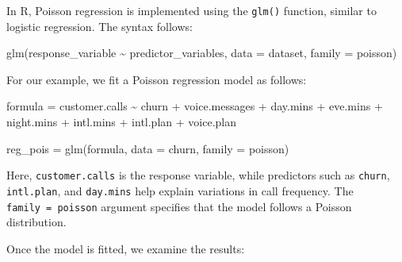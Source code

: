 \documentclass[
  11pt,
]{book}
\makeatletter
\newenvironment{Shaded}{}{}
\newcommand{\AttributeTok}[1]{#1}
\newcommand{\FunctionTok}[1]{#1}
\newcommand{\NormalTok}[1]{#1}
\newcommand{\OtherTok}[1]{\textcolor[rgb]{0.39,0.39,0.39}{#1}}
\newcommand{\SpecialCharTok}[1]{\textcolor[rgb]{0.39,0.39,0.39}{#1}}
\newenvironment{kframe}{%
\medskip{}
\setlength{\fboxsep}{.8em}
 \def\at@end@of@kframe{}%
 \ifinner\ifhmode%
  \def\at@end@of@kframe{\end{minipage}}%
  \begin{minipage}{\columnwidth}%
 \fi\fi%
 \def\FrameCommand##1{\hskip\@totalleftmargin \hskip-\fboxsep
 \colorbox{shadecolor}{##1}\hskip-\fboxsep
     \hskip-\linewidth \hskip-\@totalleftmargin \hskip\columnwidth}%
 \MakeFramed {\advance\hsize-\width
   \@totalleftmargin\z@ \linewidth\hsize
   \@setminipage}}%
 {\par\unskip\endMakeFramed%
 \at@end@of@kframe}
\renewenvironment{Shaded}{\begin{kframe}}{\end{kframe}}
\theoremstyle{definition}
\theoremstyle{definition}
\theoremstyle{definition}
\theoremstyle{definition}
\theoremstyle{remark}
\makeatother
\begin{document}
In R, Poisson regression is implemented using the \texttt{glm()} function, similar to logistic regression. The syntax follows:

\begin{Shaded}
\begin{Highlighting}[]
\FunctionTok{glm}\NormalTok{(response\_variable }\SpecialCharTok{\textasciitilde{}}\NormalTok{ predictor\_variables, }\AttributeTok{data =}\NormalTok{ dataset, }\AttributeTok{family =}\NormalTok{ poisson)}
\end{Highlighting}
\end{Shaded}

For our example, we fit a Poisson regression model as follows:

\begin{Shaded}
\begin{Highlighting}[]
\NormalTok{formula }\OtherTok{=}\NormalTok{ customer.calls }\SpecialCharTok{\textasciitilde{}}\NormalTok{ churn }\SpecialCharTok{+}\NormalTok{ voice.messages }\SpecialCharTok{+}\NormalTok{ day.mins }\SpecialCharTok{+}\NormalTok{ eve.mins }\SpecialCharTok{+} 
\NormalTok{                           night.mins }\SpecialCharTok{+}\NormalTok{ intl.mins }\SpecialCharTok{+}\NormalTok{ intl.plan }\SpecialCharTok{+}\NormalTok{ voice.plan}

\NormalTok{reg\_pois }\OtherTok{=} \FunctionTok{glm}\NormalTok{(formula, }\AttributeTok{data =}\NormalTok{ churn, }\AttributeTok{family =}\NormalTok{ poisson)}
\end{Highlighting}
\end{Shaded}

Here, \texttt{customer.calls} is the response variable, while predictors such as \texttt{churn}, \texttt{intl.plan}, and \texttt{day.mins} help explain variations in call frequency. The \texttt{family\ =\ poisson} argument specifies that the model follows a Poisson distribution.

Once the model is fitted, we examine the results:
\end{document}
